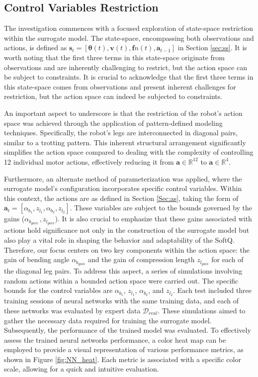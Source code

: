 \subsection{Control Variables Restriction}
The investigation commences with a focused exploration of state-space restriction within the surrogate model. The state-space, encompassing both observations and actions, is defined as $\mathbf{s}_t = [\pmb{\theta}(t), \mathbf{v}(t), \mathbf{f}n(t), \mathbf{a}_{t-1}]$ in Section \ref{sec:ss}. It is worth noting that the first three terms in this state-space originate from observations and are inherently challenging to restrict, but the action space can be subject to constraints.  It is crucial to acknowledge that the first three terms in this state-space comes from observations and present inherent challenges for restriction, but the action space can indeed be subjected to constraints. 

An important aspect to underscore is that the restriction of the robot's action space was achieved through the application of pattern-defined modeling techniques. Specifically, the robot's legs are interconnected in diagonal pairs, similar to a trotting pattern. This inherent structural arrangement significantly simplifies the action space compared to dealing with the complexity of controlling 12 individual motor actions\cite{ji2022Synthesizing}, effectively reducing it from $\mathbf{a}\in\mathbb{R}^{12}$ to $\mathbf{a}\in\mathbb{R}^4$. 

Furthermore, an alternate method of parameterization was applied, where the surrogate model's configuration incorporates specific control variables. Within this context, the actions are as defined in Section \ref{Sec:as}, taking the form of $\mathbf{a}_{t} = [\alpha_{b_1}, z_{l_1},\alpha_{b_2},z_{l_2}]$. These variables are subject to the bounds governed by the gains ($\alpha_{b_{gain}}\, , z_{l_{gain}}$). It is also crucial to emphasize that these gains associated with actions hold significance not only in the construction of the surrogate model but also play a vital role in shaping the behavior and adaptability of the SoftQ. Therefore, our focus centers on two key components within the action space: the gain of bending angle $\alpha_{b_{gain}}$ and the gain of compression length $z_{l_{gain}}$ for each of the diagonal leg pairs. To address this aspect, a series of simulations involving random actions within a bounded action space were carried out. The specific bounds for the control variables are $\alpha_{b_1}$, $z_{l_1}$, $\alpha_{b_2}$, and $z_{l_2}$. Each test included three training sessions of neural networks with the same training data, and each of these networks was evaluated by expert data $\mathcal{D}_{real}$. These simulations aimed to gather the necessary data required for training the surrogate model. Subsequently, the performance of the trained model was evaluated. To effectively assess the trained neural networks performance, a color heat map can be employed to provide a visual representation of various performance metrics, as shown in Figure \ref{fig:NN_heat}. Each metric is associated with a specific color scale, allowing for a quick and intuitive evaluation.

